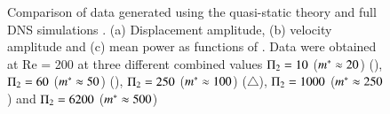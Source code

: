 \begin{figure}
{\begin{picture}
      



%      
%  

      
    \end{picture}
}
  \caption{Comparison of data generated using the quasi-static theory and full DNS simulations . (a) Displacement amplitude, (b) velocity amplitude and (c) mean power as functions of \massdamp. Data were obtained at Re = 200 at three different combined  values $\massdamp=10$ ($\mstar \approx 20$) (), $\massdamp=60$ ($\mstar \approx 50$) (), $\massdamp=250$ ($\mstar \approx 100$) ($\triangle$), $\massdamp=1000$ ($\mstar \approx 250$) and $\massdamp=6200$ ($\mstar \approx 500$) }
    \label{fig:qss_fsi}
\end{figure}

